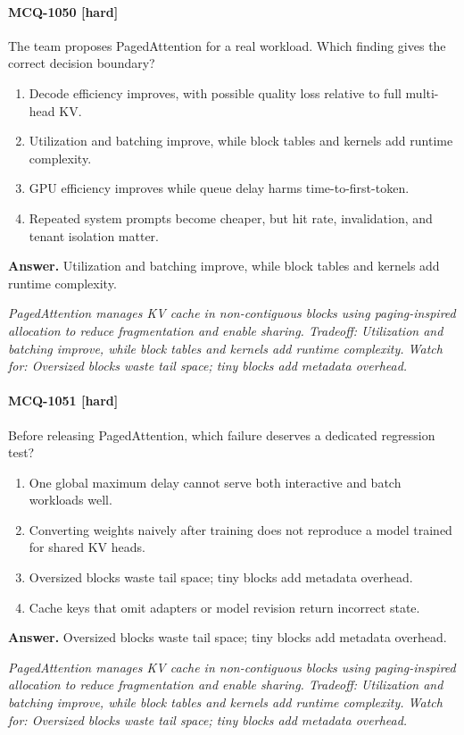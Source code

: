 \paragraph{MCQ-1050 [hard]} The team proposes PagedAttention for a real workload. Which finding gives the correct decision boundary?
\begin{enumerate}[label=\Alph*.]
\item Decode efficiency improves, with possible quality loss relative to full multi-head KV.
\item Utilization and batching improve, while block tables and kernels add runtime complexity.
\item GPU efficiency improves while queue delay harms time-to-first-token.
\item Repeated system prompts become cheaper, but hit rate, invalidation, and tenant isolation matter.
\end{enumerate}
\noindent\textbf{Answer.} Utilization and batching improve, while block tables and kernels add runtime complexity.
\par\textit{PagedAttention manages KV cache in non-contiguous blocks using paging-inspired allocation to reduce fragmentation and enable sharing. Tradeoff: Utilization and batching improve, while block tables and kernels add runtime complexity. Watch for: Oversized blocks waste tail space; tiny blocks add metadata overhead.}
\paragraph{MCQ-1051 [hard]} Before releasing PagedAttention, which failure deserves a dedicated regression test?
\begin{enumerate}[label=\Alph*.]
\item One global maximum delay cannot serve both interactive and batch workloads well.
\item Converting weights naively after training does not reproduce a model trained for shared KV heads.
\item Oversized blocks waste tail space; tiny blocks add metadata overhead.
\item Cache keys that omit adapters or model revision return incorrect state.
\end{enumerate}
\noindent\textbf{Answer.} Oversized blocks waste tail space; tiny blocks add metadata overhead.
\par\textit{PagedAttention manages KV cache in non-contiguous blocks using paging-inspired allocation to reduce fragmentation and enable sharing. Tradeoff: Utilization and batching improve, while block tables and kernels add runtime complexity. Watch for: Oversized blocks waste tail space; tiny blocks add metadata overhead.}
